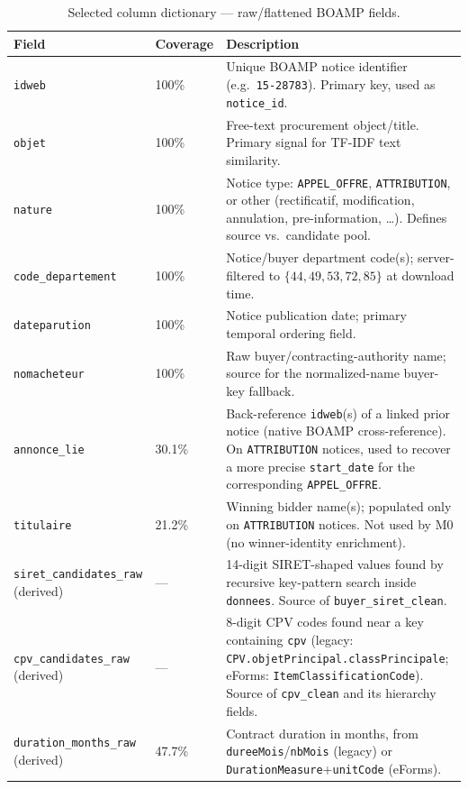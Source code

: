\documentclass[11pt]{article}
\begin{document}
\begin{table}[h!]
\centering
\caption{Selected column dictionary --- raw/flattened BOAMP fields.}
\label{tab:coldict}
\small
\begin{tabular}{p{}p{}p{}}
\toprule
Field & Coverage & Description \\
\midrule
\texttt{idweb} & 100\% & Unique BOAMP notice identifier (e.g.\ \texttt{15-28783}). Primary key, used as \texttt{notice\_id}. \\
\texttt{objet} & 100\% & Free-text procurement object/title. Primary signal for TF-IDF text similarity. \\
\texttt{nature} & 100\% & Notice type: \texttt{APPEL\_OFFRE}, \texttt{ATTRIBUTION}, or other (rectificatif, modification, annulation, pre-information, \ldots). Defines source vs.\ candidate pool. \\
\texttt{code\_departement} & 100\% & Notice/buyer department code(s); server-filtered to $\{44,49,53,72,85\}$ at download time. \\
\texttt{dateparution} & 100\% & Notice publication date; primary temporal ordering field. \\
\texttt{nomacheteur} & 100\% & Raw buyer/contracting-authority name; source for the normalized-name buyer-key fallback. \\
\texttt{annonce\_lie} & 30.1\% & Back-reference \texttt{idweb}(s) of a linked prior notice (native BOAMP cross-reference). On \texttt{ATTRIBUTION} notices, used to recover a more precise \texttt{start\_date} for the corresponding \texttt{APPEL\_OFFRE}. \\
\texttt{titulaire} & 21.2\% & Winning bidder name(s); populated only on \texttt{ATTRIBUTION} notices. Not used by M0 (no winner-identity enrichment). \\
\texttt{siret\_candidates\_raw} (derived) & --- & 14-digit SIRET-shaped values found by recursive key-pattern search inside \texttt{donnees}. Source of \texttt{buyer\_siret\_clean}. \\
\texttt{cpv\_candidates\_raw} (derived) & --- & 8-digit CPV codes found near a key containing \texttt{cpv} (legacy: \texttt{CPV.objetPrincipal.classPrincipale}; eForms: \texttt{ItemClassificationCode}). Source of \texttt{cpv\_clean} and its hierarchy fields. \\
\texttt{duration\_months\_raw} (derived) & 47.7\%\footnotemark & Contract duration in months, from \texttt{dureeMois}/\texttt{nbMois} (legacy) or \texttt{DurationMeasure}+\texttt{unitCode} (eForms). \\
\bottomrule
\end{tabular}
\end{table}
\end{document}
